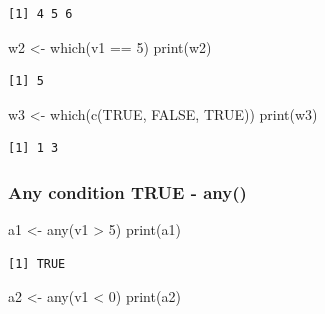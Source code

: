 \documentclass[
  letterpaper,
  DIV=11,
  numbers=noendperiod]{scrartcl}
\newenvironment{Shaded}{\begin{snugshade}}{\end{snugshade}}
\newcommand{\ConstantTok}[1]{\textcolor[rgb]{0.56,0.35,0.01}{#1}}
\newcommand{\DecValTok}[1]{\textcolor[rgb]{0.68,0.00,0.00}{#1}}
\newcommand{\FunctionTok}[1]{\textcolor[rgb]{0.28,0.35,0.67}{#1}}
\newcommand{\NormalTok}[1]{\textcolor[rgb]{0.00,0.23,0.31}{#1}}
\newcommand{\OtherTok}[1]{\textcolor[rgb]{0.00,0.23,0.31}{#1}}
\newcommand{\SpecialCharTok}[1]{\textcolor[rgb]{0.37,0.37,0.37}{#1}}
\begin{document}
\begin{verbatim}
[1] 4 5 6
\end{verbatim}

\begin{Shaded}
\begin{Highlighting}[]
\NormalTok{w2 }\OtherTok{\textless{}{-}} \FunctionTok{which}\NormalTok{(v1 }\SpecialCharTok{==} \DecValTok{5}\NormalTok{)}
\FunctionTok{print}\NormalTok{(w2)}
\end{Highlighting}
\end{Shaded}

\begin{verbatim}
[1] 5
\end{verbatim}

\begin{Shaded}
\begin{Highlighting}[]
\NormalTok{w3 }\OtherTok{\textless{}{-}} \FunctionTok{which}\NormalTok{(}\FunctionTok{c}\NormalTok{(}\ConstantTok{TRUE}\NormalTok{, }\ConstantTok{FALSE}\NormalTok{, }\ConstantTok{TRUE}\NormalTok{))}
\FunctionTok{print}\NormalTok{(w3)}
\end{Highlighting}
\end{Shaded}

\begin{verbatim}
[1] 1 3
\end{verbatim}

\subsubsection{Any condition TRUE -
any()}\label{any-condition-true---any}

\begin{Shaded}
\begin{Highlighting}[]
\NormalTok{a1 }\OtherTok{\textless{}{-}} \FunctionTok{any}\NormalTok{(v1 }\SpecialCharTok{\textgreater{}} \DecValTok{5}\NormalTok{)}
\FunctionTok{print}\NormalTok{(a1)}
\end{Highlighting}
\end{Shaded}

\begin{verbatim}
[1] TRUE
\end{verbatim}

\begin{Shaded}
\begin{Highlighting}[]
\NormalTok{a2 }\OtherTok{\textless{}{-}} \FunctionTok{any}\NormalTok{(v1 }\SpecialCharTok{\textless{}} \DecValTok{0}\NormalTok{)}
\FunctionTok{print}\NormalTok{(a2)}
\end{Highlighting}
\end{Shaded}
\end{document}
